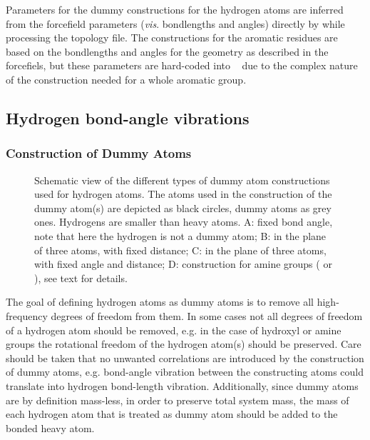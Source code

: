 Parameters for the dummy constructions for the hydrogen atoms are
inferred from the forcefield parameters ({\em vis}. bondlengths and
angles) directly by {\tt {}} while processing the
topology file.  The constructions for the aromatic residues are based
on the bondlengths and angles for the geometry as described in the
forcefiels, but these parameters are hard-coded into {\tt
{}} due to the complex nature of the construction
needed for a whole aromatic group.

\subsection{Hydrogen bond-angle vibrations}
\label{sec:dummyhydro}
\subsubsection{Construction of Dummy Atoms} %
\begin{figure}
\centerline{}
\caption[Schematic view of the different types of dummy atom
constructions used for hydrogen atoms.]{Schematic view of the
different types of dummy atom constructions used for hydrogen
atoms. The atoms used in the construction of the dummy atom(s) are
depicted as black circles, dummy atoms as grey ones. Hydrogens are
smaller than heavy atoms. {\sf A}: fixed bond angle, note that here
the hydrogen is not a dummy atom; {\sf B}: in the plane of three
atoms, with fixed distance; {\sf C}: in the plane of three atoms, with
fixed angle and distance; {\sf D}: construction for amine groups
({\amine} or {\aminep}), see text for details.}
\label{fig:dumhydro}
\end{figure}

The goal of defining hydrogen atoms as dummy atoms is to remove all
high-frequency degrees of freedom from them. In some cases not all
degrees of freedom of a hydrogen atom should be removed, e.g. in the
case of hydroxyl or amine groups the rotational freedom of the
hydrogen atom(s) should be preserved. Care should be taken that no
unwanted correlations are introduced by the construction of dummy
atoms, e.g. bond-angle vibration between the constructing atoms could
translate into hydrogen bond-length vibration. Additionally, since
dummy atoms are by definition mass-less, in order to preserve total
system mass, the mass of each hydrogen atom that is treated as dummy
atom should be added to the bonded heavy atom.

